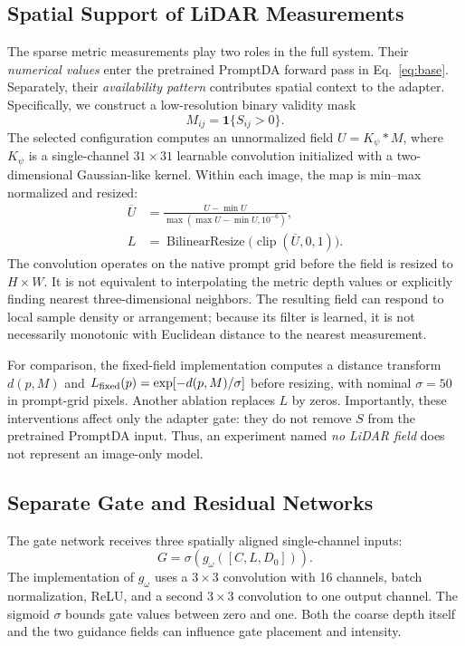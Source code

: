 \subsection{Spatial Support of LiDAR Measurements}
The sparse metric measurements play two roles in the full system. Their \emph{numerical values} enter the pretrained PromptDA forward pass in Eq.~\eqref{eq:base}. Separately, their \emph{availability pattern} contributes spatial context to the adapter. Specifically, we construct a low-resolution binary validity mask
\begin{equation}M_{ij}=\mathbf{1}\{S_{ij}>0\}.\end{equation}
The selected configuration computes an unnormalized field $U=K_\psi*M$, where $K_\psi$ is a single-channel $31\times31$ learnable convolution initialized with a two-dimensional Gaussian-like kernel. Within each image, the map is min--max normalized and resized:
\begin{align}
\overline U &= \frac{U-\min U}{\max(\max U-\min U,10^{-6})},\\
L&=\operatorname{BilinearResize}\bigl(\operatorname{clip}(\overline U,0,1)\bigr).
\label{eq:lidar}
\end{align}
The convolution operates on the native prompt grid before the field is resized to $H\times W$. It is not equivalent to interpolating the metric depth values or explicitly finding nearest three-dimensional neighbors. The resulting field can respond to local sample density or arrangement; because its filter is learned, it is not necessarily monotonic with Euclidean distance to the nearest measurement.

For comparison, the fixed-field implementation computes a distance transform $d(p,M)$ and $L_{\rm fixed}(p)=\exp[-d(p,M)/\sigma]$ before resizing, with nominal $\sigma=50$ in prompt-grid pixels. Another ablation replaces $L$ by zeros. Importantly, these interventions affect only the adapter gate: they do not remove $S$ from the pretrained PromptDA input. Thus, an experiment named \emph{no LiDAR field} does not represent an image-only model.

\subsection{Separate Gate and Residual Networks}
The gate network receives three spatially aligned single-channel inputs:
\begin{equation}
G=\sigma\left(g_\omega([C,L,D_0])\right).
\label{eq:gate}
\end{equation}
The implementation of $g_\omega$ uses a $3\times3$ convolution with 16 channels, batch normalization, ReLU, and a second $3\times3$ convolution to one output channel. The sigmoid $\sigma$ bounds gate values between zero and one. Both the coarse depth itself and the two guidance fields can influence gate placement and intensity.

